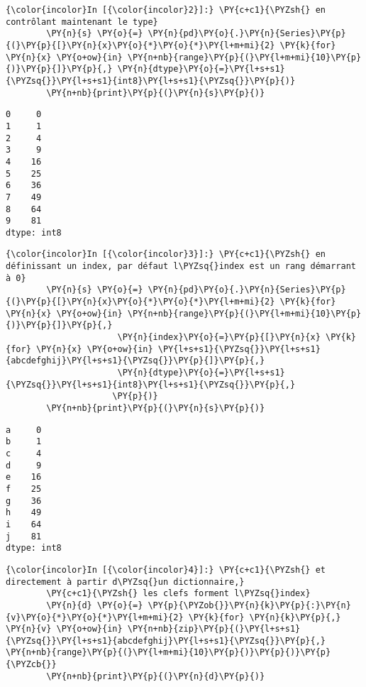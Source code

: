     \begin{Verbatim}[commandchars=\\\{\}]
{\color{incolor}In [{\color{incolor}2}]:} \PY{c+c1}{\PYZsh{} en contrôlant maintenant le type}
        \PY{n}{s} \PY{o}{=} \PY{n}{pd}\PY{o}{.}\PY{n}{Series}\PY{p}{(}\PY{p}{[}\PY{n}{x}\PY{o}{*}\PY{o}{*}\PY{l+m+mi}{2} \PY{k}{for} \PY{n}{x} \PY{o+ow}{in} \PY{n+nb}{range}\PY{p}{(}\PY{l+m+mi}{10}\PY{p}{)}\PY{p}{]}\PY{p}{,} \PY{n}{dtype}\PY{o}{=}\PY{l+s+s1}{\PYZsq{}}\PY{l+s+s1}{int8}\PY{l+s+s1}{\PYZsq{}}\PY{p}{)}
        \PY{n+nb}{print}\PY{p}{(}\PY{n}{s}\PY{p}{)}
\end{Verbatim}


    \begin{Verbatim}[commandchars=\\\{\}]
0     0
1     1
2     4
3     9
4    16
5    25
6    36
7    49
8    64
9    81
dtype: int8

    \end{Verbatim}

    \begin{Verbatim}[commandchars=\\\{\}]
{\color{incolor}In [{\color{incolor}3}]:} \PY{c+c1}{\PYZsh{} en définissant un index, par défaut l\PYZsq{}index est un rang démarrant à 0}
        \PY{n}{s} \PY{o}{=} \PY{n}{pd}\PY{o}{.}\PY{n}{Series}\PY{p}{(}\PY{p}{[}\PY{n}{x}\PY{o}{*}\PY{o}{*}\PY{l+m+mi}{2} \PY{k}{for} \PY{n}{x} \PY{o+ow}{in} \PY{n+nb}{range}\PY{p}{(}\PY{l+m+mi}{10}\PY{p}{)}\PY{p}{]}\PY{p}{,}
                      \PY{n}{index}\PY{o}{=}\PY{p}{[}\PY{n}{x} \PY{k}{for} \PY{n}{x} \PY{o+ow}{in} \PY{l+s+s1}{\PYZsq{}}\PY{l+s+s1}{abcdefghij}\PY{l+s+s1}{\PYZsq{}}\PY{p}{]}\PY{p}{,}
                      \PY{n}{dtype}\PY{o}{=}\PY{l+s+s1}{\PYZsq{}}\PY{l+s+s1}{int8}\PY{l+s+s1}{\PYZsq{}}\PY{p}{,}
                     \PY{p}{)}
        \PY{n+nb}{print}\PY{p}{(}\PY{n}{s}\PY{p}{)}
\end{Verbatim}


    \begin{Verbatim}[commandchars=\\\{\}]
a     0
b     1
c     4
d     9
e    16
f    25
g    36
h    49
i    64
j    81
dtype: int8

    \end{Verbatim}

    \begin{Verbatim}[commandchars=\\\{\}]
{\color{incolor}In [{\color{incolor}4}]:} \PY{c+c1}{\PYZsh{} et directement à partir d\PYZsq{}un dictionnaire,}
        \PY{c+c1}{\PYZsh{} les clefs forment l\PYZsq{}index}
        \PY{n}{d} \PY{o}{=} \PY{p}{\PYZob{}}\PY{n}{k}\PY{p}{:}\PY{n}{v}\PY{o}{*}\PY{o}{*}\PY{l+m+mi}{2} \PY{k}{for} \PY{n}{k}\PY{p}{,} \PY{n}{v} \PY{o+ow}{in} \PY{n+nb}{zip}\PY{p}{(}\PY{l+s+s1}{\PYZsq{}}\PY{l+s+s1}{abcdefghij}\PY{l+s+s1}{\PYZsq{}}\PY{p}{,} \PY{n+nb}{range}\PY{p}{(}\PY{l+m+mi}{10}\PY{p}{)}\PY{p}{)}\PY{p}{\PYZcb{}}
        \PY{n+nb}{print}\PY{p}{(}\PY{n}{d}\PY{p}{)}
\end{Verbatim}


